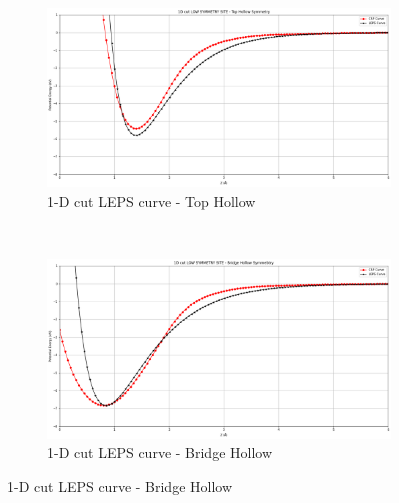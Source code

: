 \documentclass[12pt]{article}
\begin{document}
\begin{figure}[h!]
    \centering
    \begin{subfigure}[t]{0.5\textwidth}
        \centering
               \includegraphics[scale = 0.2]{1dtophollow.png}
    \caption{1-D cut LEPS curve - Top Hollow} 
    \label{fig:10}
    \end{subfigure}%
    ~ 
    \begin{subfigure}[t]{0.5\textwidth}
        \centering
    \includegraphics[scale = 0.2]{1dbridgehollow.png}
      \caption{1-D cut LEPS curve - Bridge Hollow} 
    \label{fig:11}
    \end{subfigure}
\end{figure}
\end{document}
